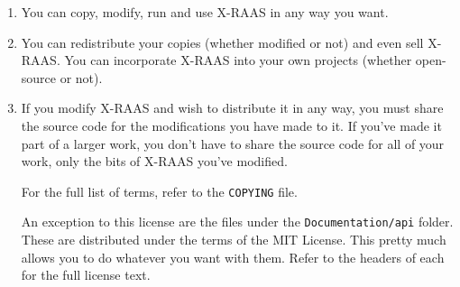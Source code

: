 \documentclass[a4paper,12pt]{article}
\begin{document}
\begin{enumerate}

\item You can copy, modify, run and use X-RAAS in any way you want.

\item You can redistribute your copies (whether modified or not) and even
sell X-RAAS. You can incorporate X-RAAS into your own projects (whether
open-source or not).

\item If you modify X-RAAS and wish to distribute it in any way, you must
share the source code for the modifications you have made to it. If
you've made it part of a larger work, you don't have to share the source
code for all of your work, only the bits of X-RAAS you've modified.

For the full list of terms, refer to the \texttt{COPYING} file.

An exception to this license are the files under the
\texttt{Documentation/api} folder. These are distributed under the terms
of the MIT License. This pretty much allows you to do whatever you want
with them. Refer to the headers of each for the full license text.

\end{enumerate}
\end{document}
